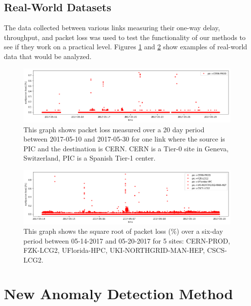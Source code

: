 \documentclass[5p]{elsarticle}
\begin{document}
\fi


\subsection{Real-World Datasets}

The data collected between various links measuring their one-way delay, throughput, and packet loss was used to test the functionality of our methods to see if they work on a practical level. Figures \ref{fig:real_one} and \ref{fig:real_five} show examples of real-world data that would be analyzed.

\begin{figure}[htbp]
    \centering
    \includegraphics[width=\linewidth]{real_data_one_link.png}
    \caption{This graph shows packet loss measured over a 20 day period between 2017-05-10 and 2017-05-30 for one link where the source is PIC and the destination is CERN. CERN is a Tier-0 site in Geneva, Switzerland, PIC is a Spanish Tier-1 center.}
    \label{fig:real_one}
\end{figure}

\begin{figure}[htbp]
    \centering
    \includegraphics[width=\linewidth]{real_data_5_links.png}
    \caption{This graph shows the square root of packet loss (\%)  over a six-day period between 05-14-2017 and 05-20-2017 for 5 sites: CERN-PROD, FZK-LCG2, UFlorida-HPC, UKI-NORTHGRID-MAN-HEP, CSCS-LCG2.}
    \label{fig:real_five}
\end{figure}

\section{New Anomaly Detection Method}
\end{document}

